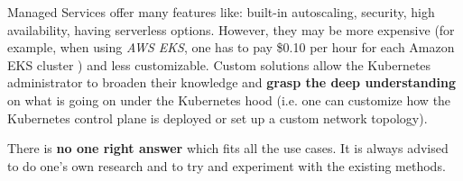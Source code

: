 Managed Services offer many features like: built-in autoscaling, security, high availability, having serverless options. However, they may be more expensive (for example, when using \textit{AWS EKS}, one has to pay \$0.10 per hour for each Amazon EKS cluster \cite{online-eks-pricing}) and less customizable. Custom solutions allow the Kubernetes administrator to broaden their knowledge and \textbf{grasp the deep understanding} on what is going on under the Kubernetes hood (i.e. one can customize how the Kubernetes control plane is deployed or set up a custom network topology).

There is \textbf{no one right answer} which fits all the use cases. It is always advised to do one's own research and to try and experiment with the existing methods.
